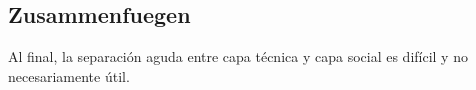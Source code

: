 \begin{comment}

[Freeman1970]
Klammer: In wie fern ist das bei mir eigentlich anwendbar? Mein Usecase hat doch eine gewisse Struktur: Kerngruppe + Lokalgruppen, in den Lokalgruppen gibts ne VV, die Entscheidungen trifft.
Vlt kann man argumentieren, dass konkrete Zuständigkeiten fehlen? Dafür kenne ich die Organisation aber viel zu schlecht. Sollte man nochmal mit denen reden?

"Elites are nothing more, and nothing less, than groups of friends
who also happen to participate in the same political activities."
Vmtl kann man ziemlich zutreffend argumentieren, dass die Kerngruppe ne Art Elite ist.
vgl auch "Superhero-Status" (im Gespräch erwähnt)

gatekeepers to infrastructure/indispensability (vgl auch 4 Charakteristiken einer erfolgreichen Kleingruppe): ist die Kerngruppe Infrastructure Gatekeeper? Man kann bestimmt von Knowledge als Ressource ausgehen und eine Wissenshierarchie feststellen. (Auch wenn große Bestrebungen gibt, der entgegen zu wirken)

7 Principles of democratic structuring:
1. delegation: Ich glaube das gibts; So was wie Kassenwart? Und eine lokale Ansprech-/zuständige Person für die Maintainence? (TODO: vgl mit Interview transcript)
2. responsibility: Es ist glaub ich schwierig, Personen zu Rechenschaft zu ziehen und Konsequenzen durchzuziehen, da ganz oft nicht gut möglich ist die Person an einer Position auszutauschen, weil sonst niemand den Posten haben will.
3. distribution: kp ob das zutrifft
4. rotation: dito
5. allocation of tascs along rational criteria (skills, interest, responsibility,..); apprenticeship program -> ich denk, das trifft auf jeden Fall zu (zumindest den Teil mit dem "apprenticeship program", es finden mehrere talleres,.. statt; Bildungsauftrag, das wird ernst genommen)
6. diffusion of information to everyone as frequently as possible - kp.
7. equal access to resources: das trifft vermutlich nicht zu;

\end{comment}

\subsection{Zusammenfuegen}

Al final, la separación aguda entre capa técnica y capa social es difícil y no necesariamente útil.

